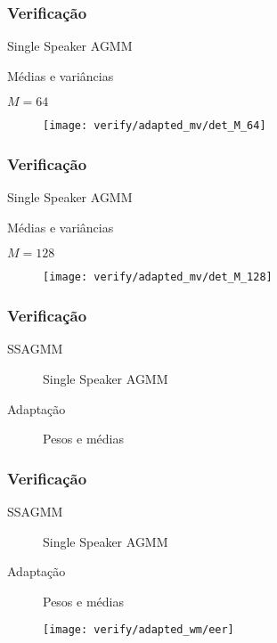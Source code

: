 \begin{frame}
\frametitle{Verificação}
\begin{description}
    \item[SSAGMM] Single Speaker AGMM
    \item[Adaptação] Médias e variâncias
    \item $M = 64$
\end{description}

\begin{figure}[ht]
    \centering
    \texttt{[image: verify/adapted\_mv/det\_M\_64]}
\end{figure}
\end{frame}

\begin{frame}
\frametitle{Verificação}
\begin{description}
    \item[SSAGMM] Single Speaker AGMM
    \item[Adaptação] Médias e variâncias
    \item $M = 128$
\end{description}

\begin{figure}[ht]
    \centering
    \texttt{[image: verify/adapted\_mv/det\_M\_128]}
\end{figure}
\end{frame}

\begin{frame}
\frametitle{Verificação}
\begin{description}
    \item[SSAGMM] Single Speaker AGMM
    \item[Adaptação] Pesos e médias
\end{description}


\end{frame}

\begin{frame}
\frametitle{Verificação}
\begin{description}
    \item[SSAGMM] Single Speaker AGMM
    \item[Adaptação] Pesos e médias
\end{description}

\begin{figure}[ht]
    \centering
    \texttt{[image: verify/adapted\_wm/eer]}
\end{figure}
\end{frame}

